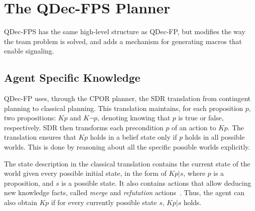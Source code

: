 \documentclass[letterpaper]{article} %
\theoremstyle{definition}
\begin{document}
\section{The QDec-FPS Planner}
%
QDec-FPS
has the
same high-level structure as QDec-FP, but modifies the way the team problem is solved, and adds a %
mechanism for generating macros that enable signaling.


\subsection{Agent Specific Knowledge}


QDec-FP uses, through the CPOR planner, the SDR translation from contingent planning to classical planning. This translation maintains, for each proposition $p$, two propositions: $Kp$ and $K\neg p$, denoting knowing that $p$ is true or false, respectively.
SDR then transforms each precondition $p$ of an action to $Kp$.
%
The translation ensures that $Kp$ holds in a belief state only if $p$ holds in all possible worlds.
This is done by reasoning about all the specific possible worlds explicitly.

The state description in the classical translation contains the current state of the world given every possible initial state, in the form of $Kp|s$, where $p$ is a proposition, and $s$ is a possible state. It also contains actions that allow deducing new knowledge facts, called {\em merge} and {\em refutation} actions~\citep{PalaciosG09}. Thus, the agent can also obtain $Kp$ if for every currently possible state $s$, $Kp|s$ holds.
\end{document}
